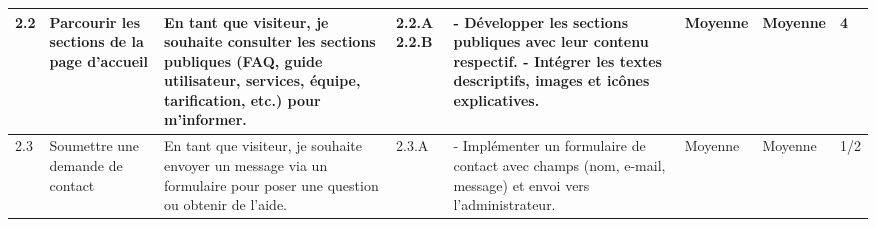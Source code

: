 \begin{landscape}
\begin{spacing}{0.94}
\begin{longtable}{|p{0.7cm}|p{2.4cm}|p{6cm}|p{1cm}|p{7.2cm}|p{0.2cm}|p{0.2cm}|p{2cm}|}
            2.2 & Parcourir les sections de la page d’accueil 
            & En tant que visiteur, je souhaite consulter les sections publiques (FAQ, guide utilisateur, services, équipe, tarification, etc.) pour m’informer. 
            & 2.2.A \newline\vspace{0.5cm}2.2.B 
            &
            - Développer les sections publiques avec leur contenu respectif. \newline
            - Intégrer les textes descriptifs, images et icônes explicatives. 
            & Moyenne & Moyenne & 4 \\ \hline
            
            2.3 & Soumettre une demande de contact
            & En tant que visiteur, je souhaite envoyer un message via un formulaire pour poser une question ou obtenir de l’aide. 
            & 2.3.A 
            &
            - Implémenter un formulaire de contact avec champs (nom, e-mail, message) et envoi vers l’administrateur. 
            & Moyenne & Moyenne & 1/2 \\ \hline
            

\end{longtable}
\end{spacing}
\end{landscape}
